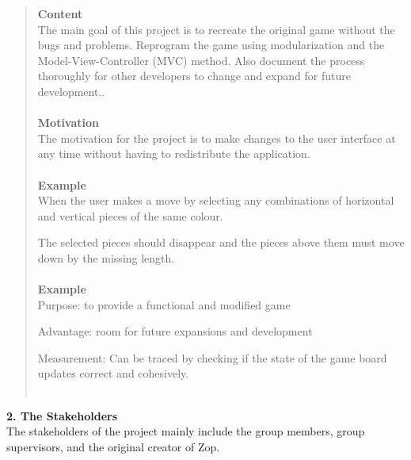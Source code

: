 \documentclass[12pt]{article}
\begin{document}
\begin{quote}
 \textbf{Content}\\
 The main goal of this project is to recreate the original game without the bugs and problems. Reprogram the game using modularization and the Model-View-Controller (MVC) method. Also document the process thoroughly for other developers to change and expand for future development..\\\\
 \textbf{Motivation}\\
 The motivation for the project is to make changes to the user interface at any time without having to redistribute the application.\\\\
 \textbf{Example}\\
When the user makes a move by selecting any combinations of horizontal and vertical pieces of the same colour.

The selected pieces should disappear and the pieces above them must move down by the missing length.\\\\
\textbf{Example}\\
Purpose: to provide a functional and modified game

Advantage: room for future expansions and development

Measurement: Can be traced by checking if the state of the game board updates correct and cohesively.\\\\
\end{quote}
\textbf{2. The Stakeholders}\\
The stakeholders of the project mainly include the group members, group supervisors, and the original creator of Zop.
\end{document}
